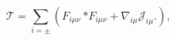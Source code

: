 \begin{equation}\label{eq:topo}
 \mathcal{T} = \sum_{i=\pm}\left(
 F_{i\mu\nu}\,{*F_{i\mu\nu}}+\nabla_{i\mu}\mathcal{J}_{i\mu}.
 \right),
\end{equation}

